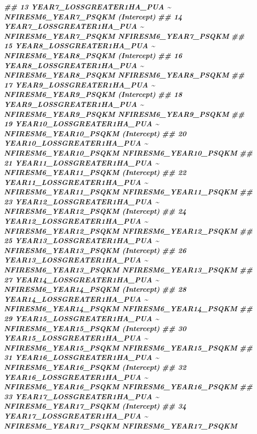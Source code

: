 \documentclass[10pt,landscape,a3paper]{article}
\newenvironment{Shaded}{\begin{snugshade}}{\end{snugshade}}
\newcommand{\DocumentationTok}[1]{\textcolor[rgb]{0.56,0.35,0.01}{\textbf{\textit{#1}}}}
\begin{document}
\begin{Shaded}
\begin{Highlighting}[]
\DocumentationTok{\#\# 13   YEAR7\_LOSSGREATER1HA\_PUA \textasciitilde{} NFIRESM6\_YEAR7\_PSQKM           (Intercept)}
\DocumentationTok{\#\# 14   YEAR7\_LOSSGREATER1HA\_PUA \textasciitilde{} NFIRESM6\_YEAR7\_PSQKM  NFIRESM6\_YEAR7\_PSQKM}
\DocumentationTok{\#\# 15   YEAR8\_LOSSGREATER1HA\_PUA \textasciitilde{} NFIRESM6\_YEAR8\_PSQKM           (Intercept)}
\DocumentationTok{\#\# 16   YEAR8\_LOSSGREATER1HA\_PUA \textasciitilde{} NFIRESM6\_YEAR8\_PSQKM  NFIRESM6\_YEAR8\_PSQKM}
\DocumentationTok{\#\# 17   YEAR9\_LOSSGREATER1HA\_PUA \textasciitilde{} NFIRESM6\_YEAR9\_PSQKM           (Intercept)}
\DocumentationTok{\#\# 18   YEAR9\_LOSSGREATER1HA\_PUA \textasciitilde{} NFIRESM6\_YEAR9\_PSQKM  NFIRESM6\_YEAR9\_PSQKM}
\DocumentationTok{\#\# 19 YEAR10\_LOSSGREATER1HA\_PUA \textasciitilde{} NFIRESM6\_YEAR10\_PSQKM           (Intercept)}
\DocumentationTok{\#\# 20 YEAR10\_LOSSGREATER1HA\_PUA \textasciitilde{} NFIRESM6\_YEAR10\_PSQKM NFIRESM6\_YEAR10\_PSQKM}
\DocumentationTok{\#\# 21 YEAR11\_LOSSGREATER1HA\_PUA \textasciitilde{} NFIRESM6\_YEAR11\_PSQKM           (Intercept)}
\DocumentationTok{\#\# 22 YEAR11\_LOSSGREATER1HA\_PUA \textasciitilde{} NFIRESM6\_YEAR11\_PSQKM NFIRESM6\_YEAR11\_PSQKM}
\DocumentationTok{\#\# 23 YEAR12\_LOSSGREATER1HA\_PUA \textasciitilde{} NFIRESM6\_YEAR12\_PSQKM           (Intercept)}
\DocumentationTok{\#\# 24 YEAR12\_LOSSGREATER1HA\_PUA \textasciitilde{} NFIRESM6\_YEAR12\_PSQKM NFIRESM6\_YEAR12\_PSQKM}
\DocumentationTok{\#\# 25 YEAR13\_LOSSGREATER1HA\_PUA \textasciitilde{} NFIRESM6\_YEAR13\_PSQKM           (Intercept)}
\DocumentationTok{\#\# 26 YEAR13\_LOSSGREATER1HA\_PUA \textasciitilde{} NFIRESM6\_YEAR13\_PSQKM NFIRESM6\_YEAR13\_PSQKM}
\DocumentationTok{\#\# 27 YEAR14\_LOSSGREATER1HA\_PUA \textasciitilde{} NFIRESM6\_YEAR14\_PSQKM           (Intercept)}
\DocumentationTok{\#\# 28 YEAR14\_LOSSGREATER1HA\_PUA \textasciitilde{} NFIRESM6\_YEAR14\_PSQKM NFIRESM6\_YEAR14\_PSQKM}
\DocumentationTok{\#\# 29 YEAR15\_LOSSGREATER1HA\_PUA \textasciitilde{} NFIRESM6\_YEAR15\_PSQKM           (Intercept)}
\DocumentationTok{\#\# 30 YEAR15\_LOSSGREATER1HA\_PUA \textasciitilde{} NFIRESM6\_YEAR15\_PSQKM NFIRESM6\_YEAR15\_PSQKM}
\DocumentationTok{\#\# 31 YEAR16\_LOSSGREATER1HA\_PUA \textasciitilde{} NFIRESM6\_YEAR16\_PSQKM           (Intercept)}
\DocumentationTok{\#\# 32 YEAR16\_LOSSGREATER1HA\_PUA \textasciitilde{} NFIRESM6\_YEAR16\_PSQKM NFIRESM6\_YEAR16\_PSQKM}
\DocumentationTok{\#\# 33 YEAR17\_LOSSGREATER1HA\_PUA \textasciitilde{} NFIRESM6\_YEAR17\_PSQKM           (Intercept)}
\DocumentationTok{\#\# 34 YEAR17\_LOSSGREATER1HA\_PUA \textasciitilde{} NFIRESM6\_YEAR17\_PSQKM NFIRESM6\_YEAR17\_PSQKM}

\end{Highlighting}
\end{Shaded}
\end{document}
